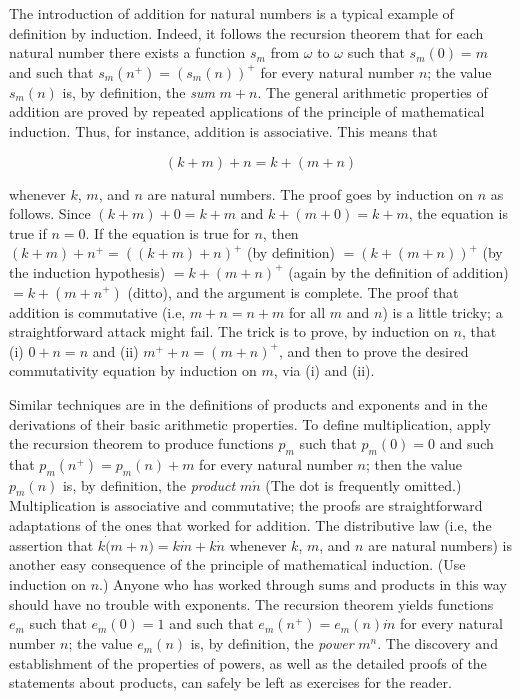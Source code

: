 
The introduction of addition for natural numbers is a typical example of definition by induction. Indeed, it follows the recursion theorem that for each natural number there exists a function $s_{m}$ from $\omega$ to $\omega$ such that $s_{m}(0) = m$ and such that $s_{m}(n^{+}) = (s_{m}(n))^{+}$ for every natural number $n$; the value $s_{m}(n)$ is, by definition, the \textit{sum} $m + n$. The general arithmetic properties of addition are proved by repeated applications of the principle of mathematical induction. Thus, for instance, addition is associative. This means that 

\begin{equation*}
(k + m) + n = k + (m + n) 
\end{equation*}

whenever $k$, $m$, and $n$ are natural numbers. The proof goes by induction on $n$ as follows. Since $(k + m) + 0 = k + m$ and $k + (m + 0) = k + m$, the equation is true if $n = 0$. If the equation is true for $n$, then $(k + m) + n^{+} = ((k+ m) + n)^{+}$ (by definition) $ = (k + (m + n))^{+}$ (by the induction hypothesis) $ = k + (m + n)^{+}$ (again by the definition of addition) $ = k + (m + n^{+})$ (ditto), and the argument is complete. The proof that addition is commutative (i.e, $m + n = n+ m$ for all $m$ and $n$) is a little tricky; a straightforward attack might fail. The trick is to prove, by induction on $n$, that (i) $0 + n = n$ and (ii) $m^{+} + n =  (m + n)^{+}$, and then to prove the desired commutativity equation by induction on $m$, via (i) and (ii). 

Similar techniques are in the definitions of products and exponents and in the derivations of their basic arithmetic properties. To define multiplication, apply the recursion theorem to produce functions $p_{m}$ such that $p_{m}(0) = 0$ and such that $p_{m}(n^{+}) = p_{m}(n) + m$ for every natural number $n$; then the value $p_{m}(n)$ is, by definition, the \textit{product} $m \dot n$ (The dot is frequently omitted.) Multiplication is associative and commutative; the proofs are straightforward adaptations of the ones that worked for addition. The distributive law (i.e, the assertion that $k \dot (m + n)  = k \dot m + k \dot n$ whenever $k$, $m$, and $n$ are natural numbers) is another easy consequence of the principle of mathematical induction. (Use induction on $n$.) Anyone who has worked through sums and products in this way should have no trouble with exponents. The recursion theorem yields functions $e_{m}$ such that $e_{m}(0) = 1$ and such that $e_{m}(n^{+}) = e_{m}(n) \dot m$ for every natural number $n$; the value $e_{m}(n)$ is, by definition, the \textit{power} $m^{n}$. The discovery and establishment of the properties of powers, as well as the detailed proofs of the statements about products, can safely be left as exercises for the reader.

